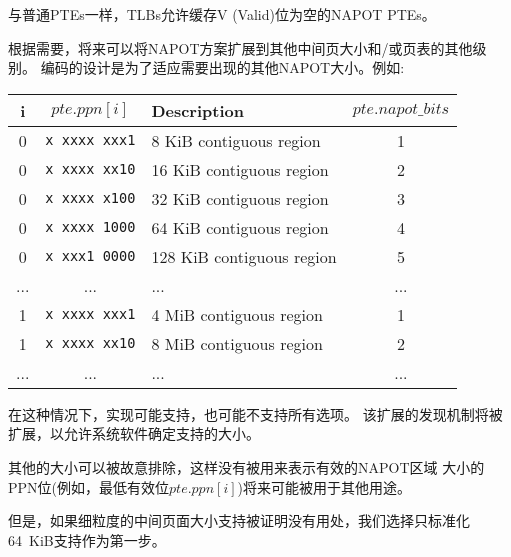 \begin{commentary}
  与普通PTEs一样，TLBs允许缓存V (Valid)位为空的NAPOT PTEs。


  根据需要，将来可以将NAPOT方案扩展到其他中间页大小和/或页表的其他级别。
  编码的设计是为了适应需要出现的其他NAPOT大小。例如:

  \begin{center}\em
  \begin{tabular}{|c|c||l|c|}
  \hline
  i        & $pte.ppn[i]$      & Description                & $pte.napot\_bits$ \\
  \hline
  0        & {\tt x~xxxx~xxx1} & 8 KiB contiguous region    & 1 \\
  0        & {\tt x~xxxx~xx10} & 16 KiB contiguous region   & 2 \\
  0        & {\tt x~xxxx~x100} & 32 KiB contiguous region   & 3 \\
  0        & {\tt x~xxxx~1000} & 64 KiB contiguous region   & 4 \\
  0        & {\tt x~xxx1~0000} & 128 KiB contiguous region  & 5 \\
  ...      & ...               & ...                        & ... \\
  1        & {\tt x~xxxx~xxx1} & 4 MiB contiguous region    & 1 \\
  1        & {\tt x~xxxx~xx10} & 8 MiB contiguous region    & 2 \\
  ...      & ...               & ...                        & ... \\
  \hline
  \end{tabular}
  \end{center}

  在这种情况下，实现可能支持，也可能不支持所有选项。
  该扩展的发现机制将被扩展，以允许系统软件确定支持的大小。

  其他的大小可以被故意排除，这样没有被用来表示有效的NAPOT区域
  大小的PPN位(例如，最低有效位$pte.ppn[i]$)将来可能被用于其他用途。

  但是，如果细粒度的中间页面大小支持被证明没有用处，我们选择只标准化64~KiB支持作为第一步。
\end{commentary}


